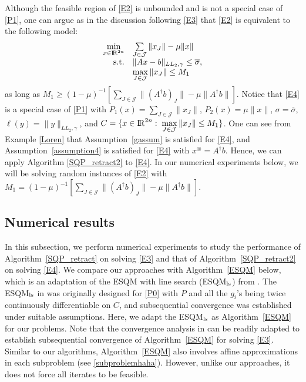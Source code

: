 \documentclass[10pt]{article}
\numberwithin{equation}{section}
\def\R{{\rm I\!R}}
\def\xfeasss{x^\circledcirc}
\begin{document}
{Although the feasible region of \eqref{E2} is unbounded and is not a special case of \eqref{P1}, one can argue as in the discussion following \eqref{E3} that \eqref{E2} is equivalent to the following model:
\begin{equation}\label{E4}
  \begin{array}{rl}
\min\limits_{x\in\R^{2n}} & \sum\limits_{J\in\mathcal{J}}\|x_J\| - \mu\|x\| \\
{\rm s.t.} & \|Ax - b\|_{LL_2,\gamma}\leq \overline{\sigma},\\
           & \max\limits_{J\in \mathcal{J}}\|x_J\| \leq M_1
  \end{array}
\end{equation}
as long as $M_1 \ge (1 - \mu)^{-1}[\sum\limits_{J\in\mathcal{J}}\|(A^\dagger b)_J\| - \mu\|A^\dagger b\|]$.
Notice that \eqref{E4} is a special case of \eqref{P1} with $P_1(x) = \sum\limits_{J\in\mathcal{J}}\|x_J\|$, $P_2(x) = \mu\|x\|$,  $\sigma=\overline{\sigma}$, $\ell(y) = \|y\|_{LL_2,\gamma}$, and $C = \{x\in\R^{2n}:\; \max\limits_{J\in \mathcal{J}}\|x_J\| \leq M_1\}$. One can see  from Example \ref{Loren} that Assumption~\ref{gassum} is satisfied for \eqref{E4}, and Assumption~\ref{assumption4} is satisfied for \eqref{E4} with $\xfeasss = A^\dagger b$. Hence, we can apply Algorithm \ref{SQP_retract2} to \eqref{E4}. In our numerical experiments below, we will be solving random instances of \eqref{E2} with $M_1 = (1 - \mu)^{-1}[\sum\limits_{J\in\mathcal{J}}\|(A^\dagger b)_J\| - \mu\|A^\dagger b\|]$. }

\subsection{Numerical results}
In this subsection, we perform numerical experiments to study the performance of Algorithm~\ref{SQP_retract} on solving \eqref{E3} and that of Algorithm~\ref{SQP_retract2} on solving \eqref{E4}.
We compare our approaches with Algorithm~\ref{ESQM} below, which is an adaptation of the ESQM with line search (ESQM$_{\rm ls}$) from \cite{Au13}. The ESQM$_{\rm ls}$ in \cite{Au13} was originally designed for \eqref{P0} with $P$ and all the $g_i$'s being twice continuously differentiable on $C$, and subsequential convergence was established under suitable assumptions. Here, we adapt the ESQM$_{\rm ls}$ as Algorithm~\ref{ESQM} for our problems. Note that the convergence analysis in \cite{Au13} can be readily adapted to establish subsequential convergence of Algorithm~\ref{ESQM} for solving \eqref{E3}. Similar to our algorithms, Algorithm~\ref{ESQM} also involves affine approximations in each subproblem (see \eqref{subproblemhaha}). However, unlike our approaches, it does not force all iterates to be feasible.
\end{document}
